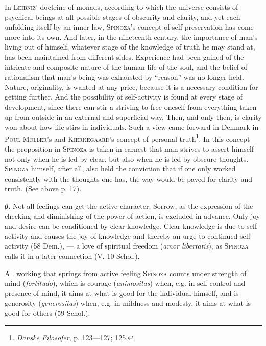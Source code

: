 \documentclass[12pt]{article}
\begin{document}
In \textsc{Leibniz}' doctrine of monads, according to which the universe consists of psychical
beings at all possible stages of obscurity and clarity, and yet each unfolding itself by an inner
law, \textsc{Spinoza}'s concept of self-preservation has come more into its own. And later, in the
nineteenth century, the importance of man's living out of himself, whatever stage of the knowledge
of truth he may stand at, has been maintained from different sides. Experience had been gained of
the intricate and composite nature of the human life of the soul, and the belief of rationalism that
man's being was exhausted by ``reason'' was no longer held. Nature, originality, is wanted at any %
price, because it is a necessary condition for getting further. And the possibility of
self-activity is found at every stage of development, since there can stir a striving to free
oneself from everything taken up from outside in an external and superficial way. Then, and only
then, is clarity won about how life stirs in individuals. Such a view came forward in Denmark in
\textsc{Poul Møller}'s and \textsc{Kierkegaard}'s concept of personal truth\footnote{\textit{Danske
Filosofer}, p. 123---127; 125.}. In this concept the proposition in \textsc{Spinoza} is taken in
earnest that man strives to assert himself not only when he is led by clear, but also when he is
led by obscure thoughts. \textsc{Spinoza} himself, after all, also held the conviction that if one
only worked consistently with the thoughts one has, the way would be paved for clarity and truth.
(See above p. 17).

\textit{β.} Not all feelings can get the active character. Sorrow, as the expression of the
checking and diminishing of the power of action, is excluded in advance. Only joy and desire can be
conditioned by clear knowledge. Clear knowledge is due to self-activity and causes the joy of
knowledge and thereby an urge to continued self-activity (58 Dem.), --- a love of spiritual freedom
(\textit{amor libertatis}), as \textsc{Spinoza} calls it in a later connection (V, 10 Schol.).

All working that springs from active feeling \textsc{Spinoza} counts under strength of mind
(\textit{fortitudo}), which is courage (\textit{animositas}) when, e.g. in self-control and
presence of mind, it aims at what is good for the individual himself, and is generosity
(\textit{generositas}) when, e.g. in mildness and modesty, it aims at what is good for others (59
Schol.). %
\end{document}
